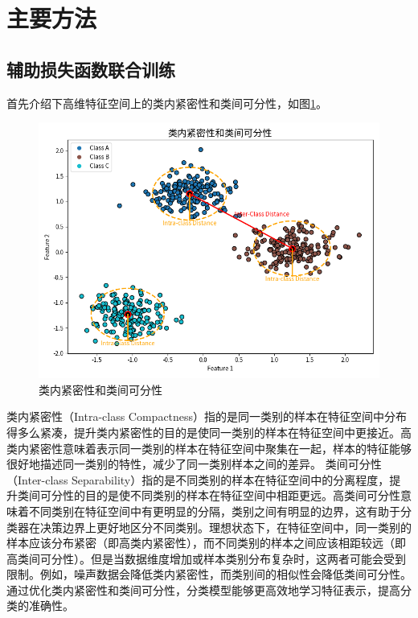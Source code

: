 \section{主要方法}
\subsection{辅助损失函数联合训练}

首先介绍下高维特征空间上的类内紧密性和类间可分性，如图\ref{interintra}。

\begin{figure}[h]
    \centering
    \includegraphics[width=1.\linewidth]{assets/inter-intra.png}
    \caption{类内紧密性和类间可分性}
    \label{interintra}
\end{figure}

类内紧密性（Intra-class Compactness）指的是同一类别的样本在特征空间中分布得多么紧凑，提升类内紧密性的目的是使同一类别的样本在特征空间中更接近。高类内紧密性意味着表示同一类别的样本在特征空间中聚集在一起，样本的特征能够很好地描述同一类别的特性，减少了同一类别样本之间的差异。 类间可分性（Inter-class Separability）指的是不同类别的样本在特征空间中的分离程度，提升类间可分性的目的是使不同类别的样本在特征空间中相距更远。高类间可分性意味着不同类别在特征空间中有更明显的分隔，类别之间有明显的边界，这有助于分类器在决策边界上更好地区分不同类别。理想状态下，在特征空间中，同一类别的样本应该分布紧密（即高类内紧密性），而不同类别的样本之间应该相距较远（即高类间可分性）。但是当数据维度增加或样本类别分布复杂时，这两者可能会受到限制。例如，噪声数据会降低类内紧密性，而类别间的相似性会降低类间可分性。通过优化类内紧密性和类间可分性，分类模型能够更高效地学习特征表示，提高分类的准确性。




